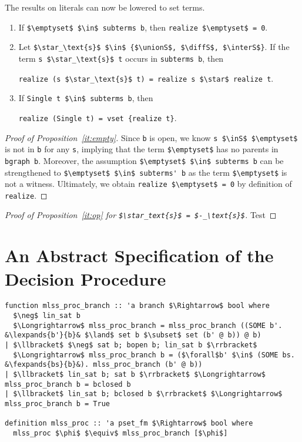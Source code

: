 \documentclass[sigplan,10pt,anonymous,review]{acmart}
\newcommand{\lefttrianglebar}{\mathrel{\tikz[baseline]{\draw (1ex, 0.75ex) -- (0, 1.25ex) -- (0, 0.25ex) -- cycle; \draw (0, 0.75ex) -- (1ex, 0.75ex);}}}
\newcommand{\lefttriangle}{\mathrel{\tikz[baseline]{\draw (1ex, 0.75ex) -- (0, 1.25ex) -- (0, 0.25ex) -- cycle;}}}
\newcommand{\lexpands}[2]{#1 $\lefttriangle$ #2}
\newcommand{\fexpands}[2]{#1 $\lefttrianglebar$ #2}
\newcommand{\unionS}{\sqcup_\text{s}}
\newcommand{\interS}{\sqcap_\text{s}}
\newcommand{\diffS}{-_\text{s}}
\newcommand{\inS}{\in_\text{s}}
\begin{document}
The results on literals can now be lowered to set terms.
\begin{enumerate}[label=(\alph*)]
  \item\label{it:empty} If \lstinline!$\emptyset$ $\in$ subterms b!, then \lstinline!realize $\emptyset$ = 0!.
  \item\label{it:op} Let \lstinline!$\star_\text{s}$ $\in$ {$\unionS$, $\diffS$, $\interS$}!. If the term \lstinline!s $\star_\text{s}$ t! occurs in \lstinline!subterms b!, then
    \begin{center}
    \lstinline!realize (s $\star_\text{s}$ t) = realize s $\star$ realize t!.
    \end{center}
  \item If \lstinline!Single t $\in$ subterms b!, then
    \begin{center}
    \lstinline!realize (Single t) = vset {realize t}!.
    \end{center}
\end{enumerate}
\begin{proof}[Proof of Proposition~\ref{it:empty}]
  Since \lstinline!b! is open, we know \lstinline!s $\inS$ $\emptyset$! is not in \lstinline!b! for any \lstinline!s!, implying that the term \lstinline!$\emptyset$! has no parents in \lstinline!bgraph b!.
  Moreover, the assumption \lstinline!$\emptyset$ $\in$ subterms b! can be strengthened to \lstinline!$\emptyset$ $\in$ subterms' b! as the term \lstinline!$\emptyset$! is not a witness. 
  Ultimately, we obtain \lstinline!realize $\emptyset$ = 0! by definition of \lstinline!realize!.
\end{proof}
\begin{proof}[Proof of Proposition~\ref{it:op} for \lstinline!$\star_text{s}$ = $\diffS$!]
  Test
\end{proof}

\section{An Abstract Specification of the Decision Procedure}
\begin{figure*}
  \centering
\begin{lstlisting}
function mlss_proc_branch :: 'a branch $\Rightarrow$ bool where
  $\neg$ lin_sat b
  $\Longrightarrow$ mlss_proc_branch = mlss_proc_branch ((SOME b'. &\lexpands{b'}{b}& $\land$ set b $\subset$ set (b' @ b)) @ b)
| $\llbracket$ $\neg$ sat b; bopen b; lin_sat b $\rrbracket$
  $\Longrightarrow$ mlss_proc_branch b = ($\forall$b' $\in$ (SOME bs. &\fexpands{bs}{b}&). mlss_proc_branch (b' @ b))
| $\llbracket$ lin_sat b; sat b $\rrbracket$ $\Longrightarrow$ mlss_proc_branch b = bclosed b
| $\llbracket$ lin_sat b; bclosed b $\rrbracket$ $\Longrightarrow$ mlss_proc_branch b = True

definition mlss_proc :: 'a pset_fm $\Rightarrow$ bool where
  mlss_proc $\phi$ $\equiv$ mlss_proc_branch [$\phi$]
\end{lstlisting}
\caption{Definition of the function \lstinline|mlss_proc_branch| and \lstinline|mlss_proc|.}
\end{figure*}
\end{document}
